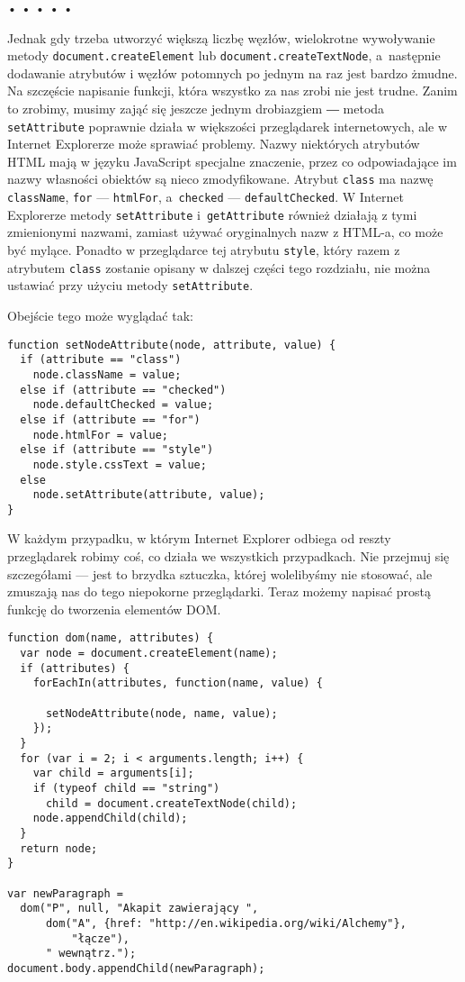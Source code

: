 \begin{center}
• • • • •
\end{center}

  
Jednak gdy trzeba utworzyć większą liczbę węzłów, wielokrotne wywoływanie metody \texttt{document.createElement} lub \texttt{document.createTextNode}, a~następnie dodawanie atrybutów i węzłów potomnych po jednym na raz jest bardzo żmudne. Na szczęście napisanie funkcji, która wszystko za nas zrobi nie jest trudne. Zanim to zrobimy, musimy zająć się jeszcze jednym drobiazgiem ― metoda \texttt{setAttribute} poprawnie działa w większości przeglądarek internetowych, ale w Internet Explorerze może sprawiać problemy. Nazwy niektórych atrybutów HTML mają w języku JavaScript specjalne znaczenie, przez co odpowiadające im nazwy własności obiektów są nieco zmodyfikowane. Atrybut \texttt{class} ma nazwę \texttt{className}, \texttt{for} — \texttt{htmlFor}, a~\texttt{checked} — \texttt{defaultChecked}. W Internet Explorerze metody \texttt{setAttribute} i~\texttt{getAttribute} również działają z tymi zmienionymi nazwami, zamiast używać oryginalnych nazw z HTML-a, co może być mylące. Ponadto w przeglądarce tej atrybutu \texttt{style}, który razem z atrybutem \texttt{class} zostanie opisany w dalszej części tego rozdziału, nie można ustawiać przy użyciu metody \texttt{setAttribute}.

  
Obejście tego może wyglądać tak:

  
\begin{verbatim} 
function setNodeAttribute(node, attribute, value) {
  if (attribute == "class")
    node.className = value;
  else if (attribute == "checked")
    node.defaultChecked = value;
  else if (attribute == "for")
    node.htmlFor = value;
  else if (attribute == "style")
    node.style.cssText = value;
  else
    node.setAttribute(attribute, value);
}
\end{verbatim}
  
W każdym przypadku, w którym Internet Explorer odbiega od reszty przeglądarek robimy coś, co działa we wszystkich przypadkach. Nie przejmuj się szczegółami — jest to brzydka sztuczka, której wolelibyśmy nie stosować, ale zmuszają nas do tego niepokorne przeglądarki. Teraz możemy napisać prostą funkcję do tworzenia elementów DOM.

  
\begin{verbatim} 
function dom(name, attributes) {
  var node = document.createElement(name);
  if (attributes) {
    forEachIn(attributes, function(name, value) {

      setNodeAttribute(node, name, value);
    });
  }
  for (var i = 2; i < arguments.length; i++) {
    var child = arguments[i];
    if (typeof child == "string")
      child = document.createTextNode(child);
    node.appendChild(child);
  }
  return node;
}

var newParagraph = 
  dom("P", null, "Akapit zawierający ",
      dom("A", {href: "http://en.wikipedia.org/wiki/Alchemy"},
          "łącze"),
      " wewnątrz.");
document.body.appendChild(newParagraph);
\end{verbatim}
  
